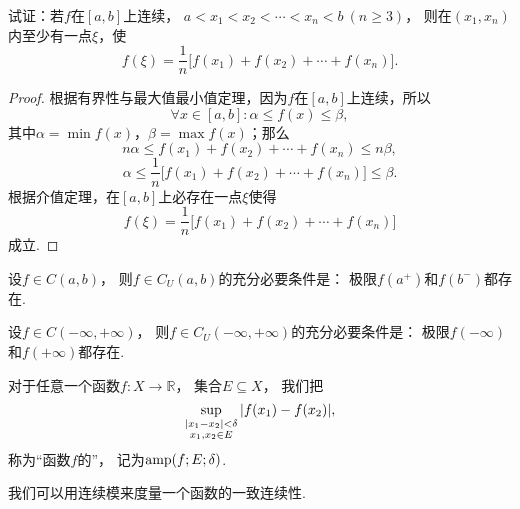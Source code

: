 \begin{example}
试证：若\(f\)在\([a,b]\)上连续，
\(a < x_1 < x_2 < \dotsb < x_n < b \ (n \geq 3)\)，
则在\((x_1,x_n)\)内至少有一点\(\xi\)，使\[
f(\xi) = \frac{1}{n} \bigl[
	f(x_1) + f(x_2) + \dotsb + f(x_n)
\bigr].
\]
\begin{proof}
根据有界性与最大值最小值定理，因为\(f\)在\([a,b]\)上连续，所以\[
\forall x \in [a,b] :
	\alpha \leq f(x) \leq \beta,
\]其中\(\alpha = \min f(x)\)，\(\beta = \max f(x)\)；那么\[
n \alpha \leq f(x_1) + f(x_2) + \dotsb + f(x_n) \leq n \beta,
\]\[
\alpha \leq \frac{1}{n} \bigl[f(x_1) + f(x_2) + \dotsb + f(x_n)\bigr] \leq \beta.
\]根据介值定理，在\([a,b]\)上必存在一点\(\xi\)使得\[
f(\xi) = \frac{1}{n} \bigl[ f(x_1) + f(x_2) + \dotsb + f(x_n) \bigr]
\]成立.
\end{proof}
\end{example}

\begin{theorem}\label{theorem:极限.闭区间上连续函数的性质.开区间上的连续函数一致连续的充分必要条件1}
设\(f \in C(a,b)\)，
则\(f \in C_U(a,b)\)的充分必要条件是：
极限\(f(a^+)\)和\(f(b^-)\)都存在.
\end{theorem}

\begin{theorem}\label{theorem:极限.闭区间上连续函数的性质.开区间上的连续函数一致连续的充分必要条件2}
设\(f \in C(-\infty,+\infty)\)，
则\(f \in C_U(-\infty,+\infty)\)的充分必要条件是：
极限\(f(-\infty)\)和\(f(+\infty)\)都存在.
\end{theorem}

\begin{definition}
对于任意一个函数\(f\colon X\to\mathbb{R}\)，
集合\(E \subseteq X\)，
我们把\[
	\sup_{\substack{
		\abs{x_1-x_2}<\delta \\
		x_1,x_2 \in E
	}}\abs{f(x_1)-f(x_2)},
\]
称为“函数\(f\)的”，
记为\(\operatorname{amp}(f;E;\delta)\).
\end{definition}

我们可以用连续模来度量一个函数的一致连续性.
